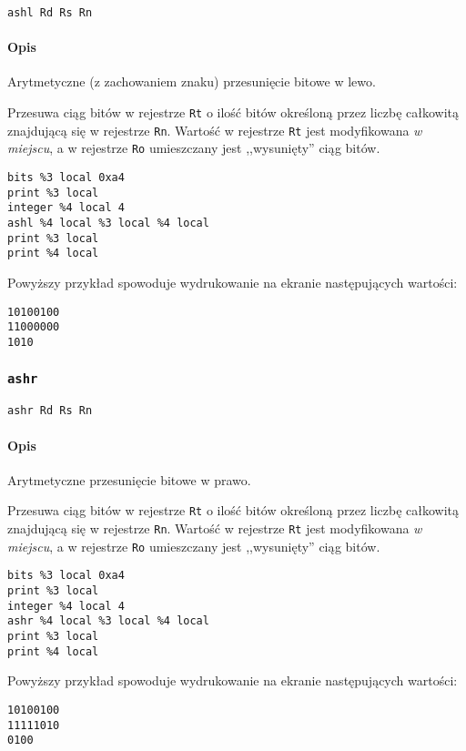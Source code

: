 \begin{lstlisting}
ashl Rd Rs Rn
\end{lstlisting}

\paragraph*{Opis} Arytmetyczne (z zachowaniem znaku) przesunięcie bitowe w lewo.

Przesuwa ciąg bitów w rejestrze \texttt{Rt} o ilość bitów określoną przez liczbę
całkowitą znajdującą się w rejestrze \texttt{Rn}. Wartość w rejestrze
\texttt{Rt} jest modyfikowana \emph{w miejscu}, a w rejestrze \texttt{Ro}
umieszczany jest ,,wysunięty'' ciąg bitów.
\begin{lstlisting}
bits %3 local 0xa4
print %3 local
integer %4 local 4
ashl %4 local %3 local %4 local
print %3 local
print %4 local
\end{lstlisting}

Powyższy przykład spowoduje wydrukowanie na ekranie następujących wartości:
\begin{lstlisting}
10100100
11000000
1010
\end{lstlisting}

\subsubsection{\texttt{ashr}}

\begin{lstlisting}
ashr Rd Rs Rn
\end{lstlisting}

\paragraph*{Opis} Arytmetyczne przesunięcie bitowe w prawo.

Przesuwa ciąg bitów w rejestrze \texttt{Rt} o ilość bitów określoną przez liczbę
całkowitą znajdującą się w rejestrze \texttt{Rn}. Wartość w rejestrze
\texttt{Rt} jest modyfikowana \emph{w miejscu}, a w rejestrze \texttt{Ro}
umieszczany jest ,,wysunięty'' ciąg bitów.
\begin{lstlisting}
bits %3 local 0xa4
print %3 local
integer %4 local 4
ashr %4 local %3 local %4 local
print %3 local
print %4 local
\end{lstlisting}

Powyższy przykład spowoduje wydrukowanie na ekranie następujących wartości:
\begin{lstlisting}
10100100
11111010
0100
\end{lstlisting}

